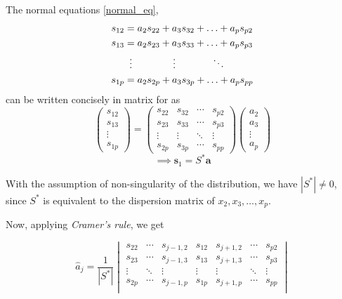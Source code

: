 \documentclass[10pt]{article}
\begin{document}
The normal equations \eqref{normal_eq}, 
\begin{align*}
	s_{12} &= a_2s_{22} + a_3s_{32} + \ldots + a_ps_{p2} \\
	s_{13} &= a_2s_{23} + a_3s_{33} + \ldots + a_ps_{p3} \\
	       &\vdotswithin{=} \hspace{0.5in} \vdots \hspace{0.5in} \ddots \\
	s_{1p} &= a_2s_{2p} + a_3s_{3p} + \ldots + a_ps_{pp} 
\end{align*}
can be written concisely in matrix for as 
$$\begin{pmatrix}
    s_{12} \\
    s_{13} \\
    \vdots \\
    s_{1p}
\end{pmatrix}
=
\begin{pmatrix}
    s_{22} & s_{32} & \cdots & s_{p2} \\
    s_{23} & s_{33} & \cdots & s_{p3} \\
    \vdots & \vdots & \ddots & \vdots \\
    s_{2p} & s_{3p} & \cdots & s_{pp}
\end{pmatrix}
\begin{pmatrix}
    a_2 \\
    a_3 \\
    \vdots \\
    a_p
\end{pmatrix}$$
\begin{equation}
	\implies \mathbf{s}_1 = S^{*}\mathbf{a}
\end{equation}

With the assumption of non-singularity of the distribution, we have $ |S^{*}| \neq 0$, since $ S^{*} $ is equivalent to the dispersion matrix of $ x_2, x_3, \ldots, x_p $.

Now, applying \textit{Cramer's rule}, we get

\[ \hat{a}_j = \frac{ 1 }{ |S^{*}| } 
\begin{vmatrix}
	s_{22} & \cdots & s_{j-1,2} & s_{12} & s_{j+1, 2} & \cdots & s_{p2} \\
	s_{23} & \cdots & s_{j-1,3} & s_{13} & s_{j+1, 3} & \cdots & s_{p3} \\
	\vdots & \ddots & \vdots & \vdots & \vdots & \ddots & \vdots \\
	s_{2p} & \cdots & s_{j-1,p} & s_{1p} & s_{j+1, p} & \cdots & s_{pp} \\
\end{vmatrix}
\] 
\end{document}
